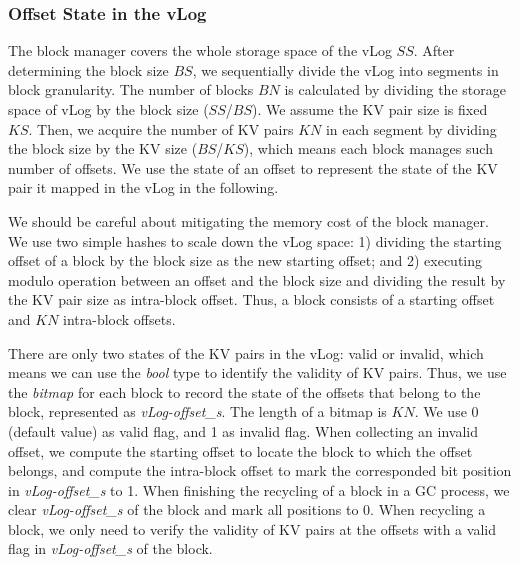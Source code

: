 \documentclass[sigconf]{acmart}
\begin{document}
\subsubsection{Offset State in the vLog}
The block manager covers the whole storage space of the vLog $SS$. After determining the block size $BS$, we sequentially divide the vLog into segments in block granularity. The number of blocks $BN$ is calculated by dividing the storage space of vLog by the block size ($SS$/$BS$). We assume the KV pair size is fixed $KS$. Then, we acquire the number of KV pairs $KN$ in each segment by dividing the block size by the KV size ($BS$/$KS$), which means each block manages such number of offsets. We use the state of an offset to represent the state of the KV pair it mapped in the vLog in the following.

We should be careful about mitigating the memory cost of the block manager. We use two simple hashes to scale down the vLog space: 1) dividing the starting offset of a block by the block size as the new starting offset; and 2) executing modulo operation between an offset and the block size and dividing the result by the KV pair size as intra-block offset. Thus, a block consists of a starting offset and $KN$ intra-block offsets.

There are only two states of the KV pairs in the vLog: valid or invalid, which means we can use the \textit{bool} type to identify the validity of KV pairs. Thus, we use the \textit{bitmap} for each block to record the state of the offsets that belong to the block, represented as \textit{vLog-offset\_s}. The length of a bitmap is $KN$. We use 0 (default value) as valid flag, and 1 as invalid flag. When collecting an invalid offset, we compute the starting offset to locate the block to which the offset belongs, and compute the intra-block offset to mark the corresponded bit position in \textit{vLog-offset\_s} to 1. When finishing the recycling of a block in a GC process, we clear \textit{vLog-offset\_s} of the block and mark all positions to 0. When recycling a block, we only need to verify the validity of KV pairs at the offsets with a valid flag in \textit{vLog-offset\_s} of the block.
\end{document}
